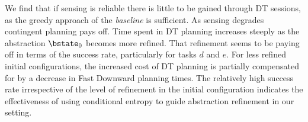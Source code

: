 We find that if sensing is reliable there is little to be gained
through DT sessions, as the greedy approach of the {\em baseline} is
sufficient. As sensing degrades contingent planning pays off.  Time
spent in DT planning increases steeply as the abstraction $\bstate_0$
becomes more refined.  That refinement seems to be paying off in terms
of the success rate, particularly for tasks $d$ and $e$. For less
refined initial configurations, the increased cost of DT
planning is partially compensated for by a decrease in Fast Downward planning
times. The relatively high success rate irrespective of the level of
refinement in the initial configuration indicates the effectiveness of
using conditional entropy to guide abstraction refinement in our
setting.

